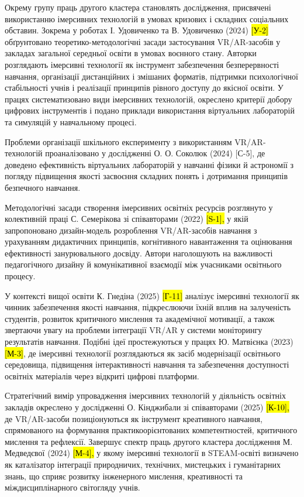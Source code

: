 Окрему групу праць другого кластера становлять дослідження, присвячені використанню імерсивних технологій в умовах кризових і складних соціальних обставин. Зокрема у роботах І. Удовиченко та В. Удовиченко (2024) \hl{{[}У-2{]}} обґрунтовано теоретико-методологічні засади застосування VR/AR-засобів у закладах загальної середньої освіти в умовах воєнного стану. Авторки розглядають імерсивні технології як інструмент забезпечення безперервності навчання, організації дистанційних і змішаних форматів, підтримки психологічної стабільності учнів і реалізації принципів рівного доступу до якісної освіти. У працях систематизовано види імерсивних технологій, окреслено критерії добору цифрових інструментів і подано приклади використання віртуальних лабораторій та симуляцій у навчальному процесі.

Проблеми організації шкільного експерименту з використанням VR/AR-технологій проаналізовано у дослідженні О. О. Соколюк (2024) {[}С-5{]}, де доведено ефективність віртуальних лабораторій у навчанні фізики й астрономії з погляду підвищення якості засвоєння складних понять і дотримання принципів безпечного навчання.

Методологічні засади створення імерсивних освітніх ресурсів розглянуто у колективній праці С. Семерікова зі співавторами (2022) \hl{{[}S-1{]},} у якій запропоновано дизайн-модель розроблення VR/AR-засобів навчання з урахуванням дидактичних принципів, когнітивного навантаження та оцінювання ефективності занурювального досвіду. Автори наголошують на важливості педагогічного дизайну й комунікативної взаємодії між учасниками освітнього процесу.

У контексті вищої освіти К. Гнедіна (2025) \hl{{[}Г-11{]}} аналізує імерсивні технології як чинник забезпечення якості навчання, підкреслюючи їхній вплив на залученість студентів, розвиток критичного мислення та академічної мотивації, а також звертаючи увагу на проблеми інтеграції VR/AR у системи моніторингу результатів навчання. Подібні ідеї простежуються у працях Ю. Матвієнка (2023) \hl{{[}М-3{]}}, де імерсивні технології розглядаються як засіб модернізації освітнього середовища, підвищення інтерактивності навчання та забезпечення доступності освітніх матеріалів через відкриті цифрові платформи.

Стратегічний вимір упровадження імерсивних технологій у діяльність освітніх закладів окреслено у дослідженні О. Кінджибали зі співавторами (2025) \hl{{[}К-10{]},} де VR/AR-засоби позиціонуються як інструмент креативного навчання, спрямованого на формування практикоорієнтованих компетентностей, критичного мислення та рефлексії. Завершує спектр праць другого кластера дослідження М. Медведєвої (2024) \hl{{[}М-4{]},} у якому імерсивні технології в STEAM-освіті визначено як каталізатор інтеграції природничих, технічних, мистецьких і гуманітарних знань, що сприяє розвитку інженерного мислення, креативності та міждисциплінарного світогляду учнів.


